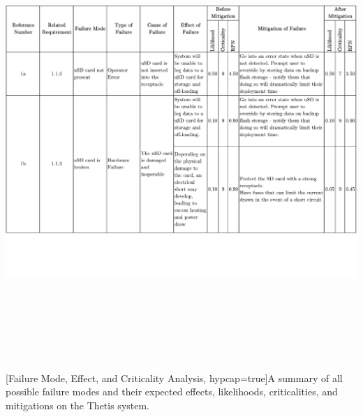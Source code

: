 \begin{landscape}
	\begingroup
		\label{tab:fmeca}
		\vspace*{-1in}\includegraphics[trim={0 0 0 0}, height=6.75in, page=1]{../include/ThetisFMECA.pdf}
		\vspace*{-1in}[Failure Mode, Effect, and Criticality Analysis, hypcap=true]{A summary of all possible failure modes and their expected effects, likelihoods, criticalities, and mitigations on the Thetis system.}
		\newpage

\end{landscape}
